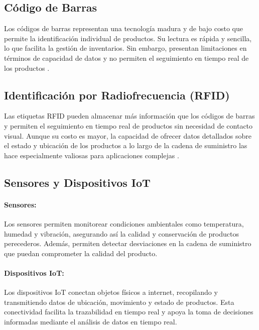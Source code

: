\documentclass[main.tex]{subfiles}
\begin{document}
\subsection{Código de Barras}

Los códigos de barras representan una tecnología madura y de bajo costo que permite la identificación individual de productos. Su lectura es rápida y sencilla, lo que facilita la gestión de inventarios. Sin embargo, presentan limitaciones en términos de capacidad de datos y no permiten el seguimiento en tiempo real de los productos \cite{schuitemaker2020product}.

\subsection{Identificación por Radiofrecuencia (RFID)}

Las etiquetas RFID pueden almacenar más información que los códigos de barras y permiten el seguimiento en tiempo real de productos sin necesidad de contacto visual. Aunque su costo es mayor, la capacidad de ofrecer datos detallados sobre el estado y ubicación de los productos a lo largo de la cadena de suministro las hace especialmente valiosas para aplicaciones complejas \cite{schuitemaker2020product}.

\subsection{Sensores y Dispositivos IoT}

\paragraph{Sensores:}

Los sensores permiten monitorear condiciones ambientales como temperatura, humedad y vibración, asegurando así la calidad y conservación de productos perecederos. Además, permiten detectar desviaciones en la cadena de suministro que puedan comprometer la calidad del producto.

\paragraph{Dispositivos IoT:}

Los dispositivos IoT conectan objetos físicos a internet, recopilando y transmitiendo datos de ubicación, movimiento y estado de productos. Esta conectividad facilita la trazabilidad en tiempo real y apoya la toma de decisiones informadas mediante el análisis de datos en tiempo real.
\end{document}
